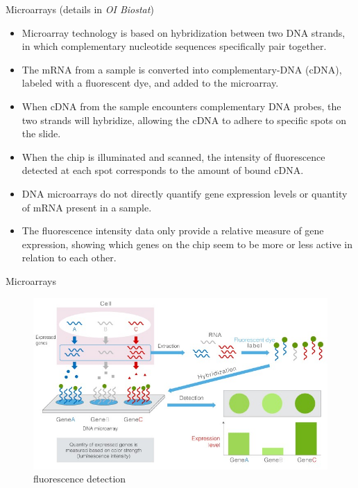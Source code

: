 \documentclass[
  ignorenonframetext,
]{beamer}
\begin{document}
\begin{frame}{Microarrays (details in \emph{OI Biostat})}
\protect\hypertarget{microarrays-details-in-oi-biostat}{}

\small

\begin{itemize}
\item
  Microarray technology is based on hybridization between two DNA
  strands, in which complementary nucleotide sequences specifically pair
  together.
\item
  The mRNA from a sample is converted into complementary-DNA (cDNA),
  labeled with a fluorescent dye, and added to the microarray.
\item
  When cDNA from the sample encounters complementary DNA probes, the two
  strands will hybridize, allowing the cDNA to adhere to specific spots
  on the slide.
\item
  When the chip is illuminated and scanned, the intensity of
  fluorescence detected at each spot corresponds to the amount of bound
  cDNA.
\item
  DNA microarrays do not directly quantify gene expression levels or
  quantity of mRNA present in a sample.
\item
  The fluorescence intensity data only provide a relative measure of
  gene expression, showing which genes on the chip seem to be more or
  less active in relation to each other.
\end{itemize}

\end{frame}

\begin{frame}{Microarrays}
\protect\hypertarget{microarrays}{}

\begin{figure}
\centering
\includegraphics{figures/microarray_schematic.jpg}
\caption{fluorescence detection}
\end{figure}

\end{frame}
\end{document}
